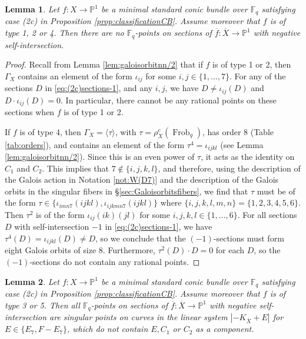 \documentclass[a4paper, 11pt, reqno]{amsart}
\numberwithin{equation}{section} \numberwithin{figure}{section}
\DeclareMathOperator{\Frob}{Frob}
\def \F {{\mathbb F}}
\def \P {{\mathbb P}}
\newcommand{\ra}{\rightarrow}
\newtheorem{lemma}{Lemma}
\theoremstyle{definition}
\numberwithin{lemma}{section}
\begin{document}
\begin{lemma}\label{lem:type124ratlptssections}
    Let $f \colon X \ra \P^1$ be a minimal standard conic bundle over $\F_q$ satisfying case (2c) in Proposition \ref{prop:classificationCB}. Assume moreover that $f$ is of type 1, 2 or 4. Then there are no $\F_q$-points on sections of $\overline{f} \colon \overline{X} \ra \P^1$ with negative self-intersection.
\end{lemma}

\begin{proof}
    Recall from Lemma \ref{lem:galoisorbitnn/2} that if $f$ is of type 1 or 2, then $\Gamma_X$ contains an element of the form $\iota_{ij}$ for some $i, j \in \{1, \ldots, 7\}$. For any of the sections $D$ in \eqref{eq:(2c)sections-1}, and any $i, j$, we have $D \neq \iota_{ij}(D)$ and $D \cdot \iota_{ij}(D) = 0$. In particular, there cannot be any rational points on these sections when $f$ is of type 1 or 2.

    If $f$ is of type 4, then $\Gamma_X = \langle \tau \rangle$, with $\tau = \rho_X^c(\Frob_q)$, has order 8 (Table \ref{tab:orders}), and contains an element of the form $\tau^4 = \iota_{ijkl}$ (see Lemma \ref{lem:galoisorbitnn/2}). Since this is an even power of $\tau$, it acts as the identity on $C_1$ and $C_2$. This implies that $7 \notin \{i, j, k, l\}$, and therefore, using the description of the Galois action in Notation \ref{not:W(D7)} and the description of the Galois orbits in the singular fibers in \S\ref{sec:Galoisorbitsfibers}, we find that $\tau$ must be of the form $\tau \in \{\iota_{imn7}(ijkl), \iota_{ijkmn7}(ijkl)\}$ where $\{i, j, k, l, m, n\} = \{1, 2, 3, 4, 5, 6\}$. Then $\tau^2$ is of the form $\iota_{ij}(ik)(jl)$ for some $i, j, k, l \in \{1, \ldots, 6\}$. For all sections $D$ with self-intersection $-1$ in \eqref{eq:(2c)sections-1}, we have $\tau^4(D) = \iota_{ijkl}(D) \neq D$, so we conclude that the $(-1)$-sections must form eight Galois orbits of size 8. Furthermore, $\tau^2(D) \cdot D = 0$ for each $D$, so the $(-1)$-sections do not contain any rational points.
\end{proof}

\begin{lemma}\label{lem:type35ratlptssections}
     Let $f \colon X \ra \P^1$ be a minimal standard conic bundle over $\F_q$ satisfying case (2c) in Proposition \ref{prop:classificationCB}. Assume moreover that $f$ is of type 3 or 5. Then all $\F_q$-points on sections of $\overline{f} \colon \overline{X} \ra \P^1$ with negative self-intersection are singular points on curves in the linear system $|-K_{\overline{X}} + E|$ for $E \in \{E_7, F - E_7\}$, which do not contain $E, C_1$ or $C_2$ as a component.
\end{lemma}
\end{document}
